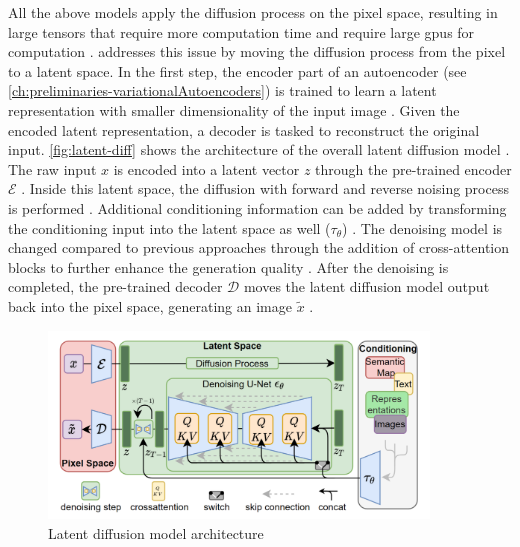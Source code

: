 All the above models apply the diffusion process on the pixel space, resulting in large tensors that require more computation time and require large \glspl{gpu} for computation \cite{rombach2022HighResolutionImageSynthesis}.
\cite{rombach2022HighResolutionImageSynthesis} addresses this issue by moving the diffusion process from the pixel to a latent space.
In the first step, the encoder part of an autoencoder (see \autoref{ch:preliminaries-variationalAutoencoders}) is trained to learn a latent representation with smaller dimensionality of the input image \cite{rombach2022HighResolutionImageSynthesis}.
Given the encoded latent representation, a decoder is tasked to reconstruct the original input.
\autoref{fig:latent-diff} shows the architecture of the overall latent diffusion model \cite[Figure 3, p.4]{rombach2022HighResolutionImageSynthesis}.
The raw input $x$ is encoded into a latent vector $z$ through the pre-trained encoder $\mathcal{E}$ \cite{rombach2022HighResolutionImageSynthesis}.
Inside this latent space, the diffusion with forward and reverse noising process is performed \cite{rombach2022HighResolutionImageSynthesis}.
Additional conditioning information can be added by transforming the conditioning input into the latent space as well ($\tau_\theta$) \cite{rombach2022HighResolutionImageSynthesis}.
The denoising model is changed compared to previous approaches through the addition of cross-attention blocks to further enhance the generation quality \cite{rombach2022HighResolutionImageSynthesis}.
After the denoising is completed, the pre-trained decoder $\mathcal{D}$ moves the latent diffusion model output back into the pixel space, generating an image $\tilde{x}$ \cite{rombach2022HighResolutionImageSynthesis}.

\begin{figure}[h]
    \centering
    \includegraphics[width=0.9\textwidth]{images/latent-diff.png}
    \caption[Latent Diffusion Model]{Latent diffusion model architecture \cite[Figure 3, p.4]{rombach2022HighResolutionImageSynthesis}}
    \label{fig:latent-diff}
\end{figure}

